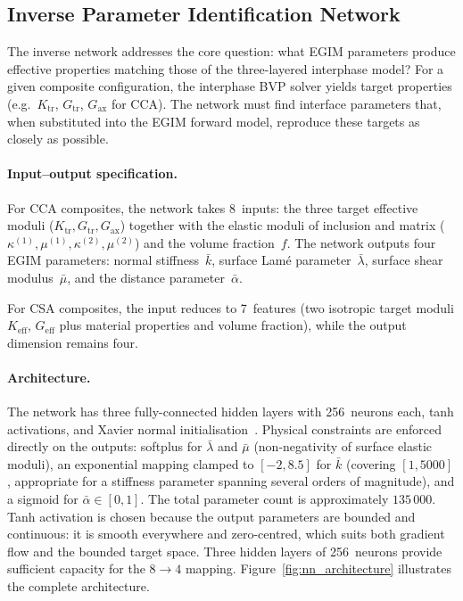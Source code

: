 \documentclass[oneside, 12pt, a4paper, bibliography=totoc]{book}
\begin{document}
\subsection{Inverse Parameter Identification Network}
\label{subsec:inverse_network}

The inverse network addresses the core question: what EGIM parameters produce effective properties matching those of the three-layered interphase model? For a given composite configuration, the interphase BVP solver yields target properties (e.g.\ $K_{\text{tr}}$, $G_{\text{tr}}$, $G_{\text{ax}}$ for CCA). The network must find interface parameters that, when substituted into the EGIM forward model, reproduce these targets as closely as possible.

\paragraph{Input--output specification.}
For CCA composites, the network takes 8~inputs: the three target effective moduli ($K_{\text{tr}}, G_{\text{tr}}, G_{\text{ax}}$) together with the elastic moduli of inclusion and matrix ($\kappa^{(1)}, \mu^{(1)}, \kappa^{(2)}, \mu^{(2)}$) and the volume fraction~$f$. The network outputs four EGIM parameters: normal stiffness~$\bar{k}$, surface Lam\'{e} parameter~$\bar{\lambda}$, surface shear modulus~$\bar{\mu}$, and the distance parameter~$\bar{\alpha}$.

For CSA composites, the input reduces to 7~features (two isotropic target moduli $K_{\text{eff}}$, $G_{\text{eff}}$ plus material properties and volume fraction), while the output dimension remains four.

\paragraph{Architecture.}
The network has three fully-connected hidden layers with 256~neurons each, tanh activations, and Xavier normal initialisation~\cite{Glorot2010}. Physical constraints are enforced directly on the outputs: softplus for $\bar{\lambda}$ and $\bar{\mu}$ (non-negativity of surface elastic moduli), an exponential mapping clamped to $[-2, 8.5]$ for $\bar{k}$ (covering $[1, 5000]$, appropriate for a stiffness parameter spanning several orders of magnitude), and a sigmoid for $\bar{\alpha} \in [0, 1]$. The total parameter count is approximately $135\,000$. Tanh activation is chosen because the output parameters are bounded and continuous: it is smooth everywhere and zero-centred, which suits both gradient flow and the bounded target space. Three hidden layers of 256~neurons provide sufficient capacity for the $8 \to 4$ mapping. Figure~\ref{fig:nn_architecture} illustrates the complete architecture.
\end{document}
